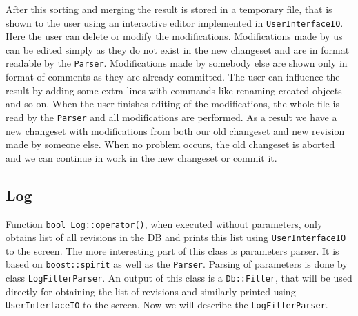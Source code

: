 \documentclass[deska]{subfiles}
\begin{document}
After this sorting and merging the result is stored in a temporary file, that is shown to the user using an interactive editor
implemented in {\tt UserInterfaceIO}. Here the user can delete or modify the modifications. Modifications made by us can be
edited simply as they do not exist in the new changeset and are in format readable by the {\tt Parser}. Modifications made by
somebody else are shown only in format of comments as they are already committed. The user can influence the result by
adding some extra lines with commands like renaming created objects and so on. When the user finishes editing of the
modifications, the whole file is read by the {\tt Parser} and all modifications are performed. As a result we have a
new changeset with modifications from both our old changeset and new revision made by someone else. When no problem
occurs, the old changeset is aborted and we can continue in work in the new changeset or commit it.

\subsection{Log}

Function {\tt bool Log::operator()}, when executed without parameters, only obtains list of all revisions in the DB and
prints this list using {\tt UserInterfaceIO} to the screen. The more interesting part of this class is parameters parser.
It is based on {\tt boost::spirit} as well as the {\tt Parser}. Parsing of parameters is done by class {\tt LogFilterParser}.
An output of this class is a {\tt Db::Filter}, that will be used directly for obtaining the list of revisions and similarly
printed using {\tt UserInterfaceIO} to the screen. Now we will describe the {\tt LogFilterParser}.
\end{document}
